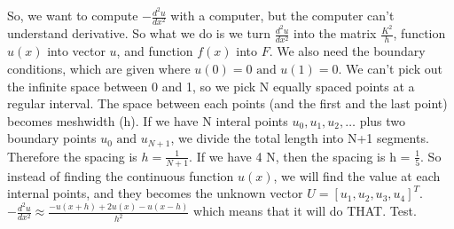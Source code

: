 So, we want to compute \(-\frac{d^2 u}{dx^2}\) with a computer, but the computer can't understand derivative. 
So what we do is we turn \(\frac{d^2 u}{dx^2}\)  into the matrix \(\frac{K^2}{h}\),
function \(u(x)\)  into vector \(u\), and function \(f(x)\) into \(F\).
We also need the boundary conditions, which are given where \(u(0) = 0 \text{ and } u(1)=0\). 
We can't pick out the infinite space between 0 and 1, so we pick N equally spaced points at a regular interval. 
The space between each points (and the first and the last point) becomes meshwidth (h). 
If we have N interal points \(u_0, u_1, u_2, \ldots\) plus two boundary points \(u_0 \text{ and } u_{N+1}\), we divide the total length into N+1 segments.
Therefore the spacing is \(h = \frac{1}{N+1}\).
If we have 4 N, then the spacing is h = \(\frac{1}{5}\).
So instead of finding the continuous function \(u(x)\), we will find the value at each internal points, and they becomes the unknown vector \(U = [u_1, u_2, u_3, u_4]^T\).
\medbreak
\(-\frac{d^2 u}{dx^2} \approx  \frac{-u(x+h) + 2u(x) - u(x-h)}{h^2}\) which means that it will do THAT. Test.
